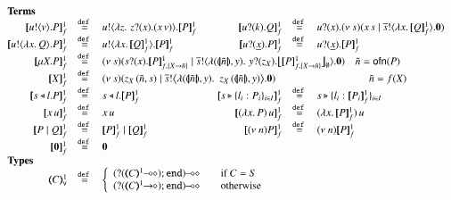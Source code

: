 \begin{figure}[h!]
\[
	\begin{array}{rclcrcl}
		\multicolumn{7}{l}{\textrm{\bf Terms}}
		\\
		\pmapp{\bout{u}{v} P}{1}{f}	&\defeq&	\bout{u}{ \abs{z}{\,\binp{z}{x} (\appl{x}{v}}) } \pmapp{P}{1}{f}
		& &
		\pmapp{\binp{u}{k} Q}{1}{f}	&\defeq&	\binp{u}{x} \newsp{s}{\appl{x}{s} \Par \bout{\dual{s}}{\abs{x}{\pmapp{Q}{1}{f}}} \inact}
		\\
		\pmapp{\bout{u}{\abs{x}{Q}} P}{1}{f} &\defeq& \bout{u}{\abs{x}{\pmapp{Q}{1}{f}}} \pmapp{P}{1}{f}
		& &
		\pmapp{\binp{u}{\underline{x}} P}{1}{f}	&\defeq&	\binp{u}{\underline{x}} \pmapp{P}{1}{f}
		\\
		\pmapp{\recp{X}{P}}{1}{f} &\defeq&
		\multicolumn{5}{l}{
			\newsp{s}{\binp{s}{x} \pmapp{P}{1}{{f,\{\varp{X}\to \tilde{n}\}}} \Par
			\bout{\dual{s}}{\abs{(\vmap{\tilde{n}}, y)} \,{\binp{y}{z_X} \auxmap{\pmapp{P}{1}{{f,\{\varp{X}\to \tilde{n}\}}}}{\es}}} \inact}
			\quad \tilde{n} = \ofn{P}
		}
		\\
		\pmapp{\varp{X}}{1}{f} &\defeq&
		\multicolumn{5}{l}{
			\newsp{s}{\appl{z_X}{(\tilde{n}, s)} \Par \bbout{\dual{s}}{ \abs{(\vmap{\tilde{n}},y)}\,\,{\appl{z_X}{(\vmap{\tilde{n}}, y)}}} \inact}
			\qquad \qquad \qquad \qquad \quad \tilde{n} = f(\varp{X})
		}
		\\
		\pmapp{\bsel{s}{l} P}{1}{f}	&\defeq&	\bsel{s}{l} \pmapp{P}{1}{f}
		& & 
		\pmapp{\bbra{s}{l_i: P_i}_{i \in I}}{1}{f} &\defeq& \bbra{s}{l_i: \pmapp{P_i}{1}{f}}_{i \in I}
		\\
		\pmapp{\appl{x}{u}}{1}{f}	&\defeq&	\appl{x}{u}
		& &
		\pmapp{(\appl{\abs{x}{P})}{u}}{1}{f}	&\defeq&	\appl{(\abs{x}{\pmapp{P}{1}{f}})}{u}
		\\
		\pmapp{P \Par Q}{1}{f}		&\defeq&	\pmapp{P}{1}{f} \Par \pmapp{Q}{1}{f}
		& &
		\pmapp{\news{n} P}{1}{f}	&\defeq&	\news{n} \pmapp{P}{1}{f}
		\\
		\pmapp{\inact}{1}{f}		&\defeq&	\inact
		\\
		\multicolumn{7}{l}{\textrm{\bf Types}}
		\\
		\tmap{C}{1}_\mathsf{v}		&\defeq&
		\multicolumn{5}{l}{
			\left\{
			\begin{array}{rcl}
				\lhot{(\btinp{\lhot{\tmap{C}{1}}} \tinact)} && \textrm{if } C = S\\
				\lhot{(\btinp{\shot{\tmap{C}{1}}} \tinact)} && \textrm{otherwise}\\
			\end{array}
			\right.
		}
		\\

\end{array}\]
\end{figure}
